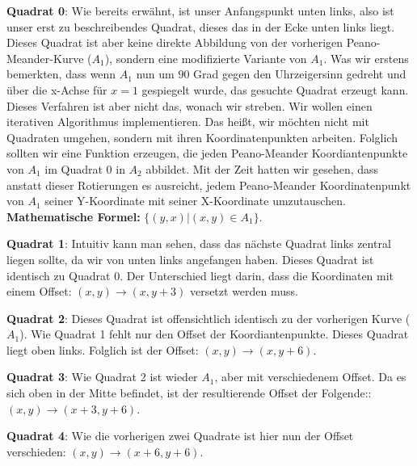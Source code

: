 \documentclass[course=erap]{aspdoc}
\begin{document}
\large\textbf{Quadrat 0}: Wie bereits erwähnt, ist unser Anfangspunkt unten links, also ist unser erst zu beschreibendes Quadrat, dieses das in der Ecke unten links liegt. Dieses Quadrat ist aber keine direkte Abbildung von der vorherigen Peano-Meander-Kurve ($A_1$), sondern eine modifizierte Variante von $A_1$. Was wir erstens bemerkten, dass wenn $A_1$ nun um $90$ Grad gegen den Uhrzeigersinn gedreht und über die x-Achse für $x=1$ gespiegelt wurde, das gesuchte Quadrat erzeugt kann. Dieses Verfahren ist aber nicht das, wonach wir streben. Wir wollen einen iterativen Algorithmus implementieren. Das heißt, wir möchten nicht mit Quadraten umgehen, sondern mit ihren Koordinatenpunkten arbeiten. Folglich sollten wir eine Funktion erzeugen, die jeden Peano-Meander Koordiantenpunkte von $A_1$ im Quadrat $0$ in $A_2$ abbildet. Mit der Zeit hatten wir gesehen, dass anstatt dieser Rotierungen es ausreicht, jedem Peano-Meander Koordinatenpunkt von $A_1$ seiner Y-Koordinate mit seiner X-Koordinate umzutauschen. \newline \textbf{Mathematische Formel:} $\{(y,x) | (x,y) \in A_1\}$.\newline


\large\textbf{Quadrat 1}: Intuitiv kann man sehen, dass das nächste Quadrat links zentral liegen sollte, da wir von unten links angefangen haben. Dieses Quadrat ist identisch zu Quadrat $0$. Der Unterschied liegt darin, dass die Koordinaten mit einem Offset: $(x,y) \to (x,y+3)$ versetzt werden muss.\newline


\large\textbf{Quadrat 2}: Dieses Quadrat ist offensichtlich identisch zu der vorherigen Kurve ($A_1$). Wie Quadrat 1 fehlt nur den Offset der Koordiantenpunkte. Dieses Quadrat liegt oben links. Folglich ist der Offset: $(x,y) \to (x,y+6)$.   \newline

\large\textbf{Quadrat 3}: Wie Quadrat 2 ist wieder $A_1$, aber mit verschiedenem Offset. Da es sich oben in der Mitte befindet, ist der resultierende Offset der Folgende:: $(x,y) \to (x+3,y+6)$.\newline

\large\textbf{Quadrat 4}: Wie die vorherigen zwei Quadrate ist hier nun der Offset verschieden: $(x,y) \to (x+6,y+6)$.\newline
\end{document}
